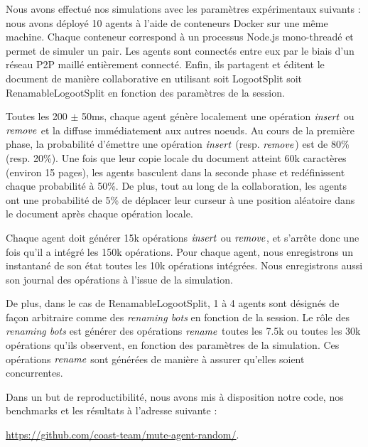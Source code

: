 Nous avons effectué nos simulations avec les paramètres expérimentaux suivants : nous avons déployé 10 agents à l'aide de conteneurs Docker sur une même machine.
Chaque conteneur correspond à un processus Node.js mono-threadé et permet de simuler un pair.
Les agents sont connectés entre eux par le biais d'un réseau P2P maillé entièrement connecté.
Enfin, ils partagent et éditent le document de manière collaborative en utilisant soit LogootSplit soit RenamableLogootSplit en fonction des paramètres de la session.

Toutes les 200 $\pm$ 50ms, chaque agent génère localement une opération $\mathit{insert}$ ou $\mathit{remove}$ et la diffuse immédiatement aux autres noeuds.
Au cours de la première phase, la probabilité d'émettre une opération $\mathit{insert}$ (resp. $\mathit{remove}$) est de 80\% (resp. 20\%).
Une fois que leur copie locale du document atteint 60k caractères (environ 15 pages), les agents basculent dans la seconde phase et redéfinissent chaque probabilité à 50\%.
De plus, tout au long de la collaboration, les agents ont une probabilité de 5\% de déplacer leur curseur à une position aléatoire dans le document après chaque opération locale.

Chaque agent doit générer 15k opérations $\mathit{insert}$ ou $\mathit{remove}$, et s'arrête donc une fois qu'il a intégré les 150k opérations.
Pour chaque agent, nous enregistrons un instantané de son état toutes les 10k opérations intégrées.
Nous enregistrons aussi son journal des opérations à l'issue de la simulation.

De plus, dans le cas de RenamableLogootSplit, 1 à 4 agents sont désignés de façon arbitraire comme des \emph{renaming bots} en fonction de la session.
Le rôle des \emph{renaming bots} est générer des opérations $\mathit{rename}$ toutes les 7.5k ou toutes les 30k opérations qu'ils observent, en fonction des paramètres de la simulation.
Ces opérations $\mathit{rename}$ sont générées de manière à assurer qu'elles soient concurrentes.

Dans un but de reproductibilité, nous avons mis à disposition notre code, nos benchmarks et les résultats à l'adresse suivante :
\begin{center}
    \url{https://github.com/coast-team/mute-agent-random/}.
\end{center}
